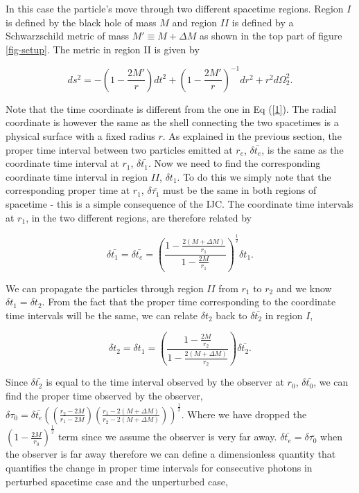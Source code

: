 \documentclass[aps,showpacs,onecolumn,floats,prd,superscriptaddress,nofootinbib]{revtex4-1}
\begin{document}
In this case the particle's move through two different spacetime regions. Region $I$ is defined by the black hole of mass $M$ and region $II$ is defined by a Schwarzschild metric of mass $M' \equiv M+\Delta M$ as shown in the top part of figure \ref{fig-setup}. The metric in region II is given by 

\begin{equation}
	ds^2 = - \left( 1 - \frac{2M'}{r} \right) d t^2 + \left( 1 - \frac{2M'}{r} \right)^{-1} dr^2 + r^2 d \Omega_2^2	\label{2}.
\end{equation}

Note that the time coordinate is different from the one in Eq (\ref{1}). The radial coordinate is however the same as the shell connecting the two spacetimes is a physical surface with a fixed radius $r$. As explained in the previous section, the proper time interval between two particles emitted at $r_e$, $\delta \bar{t_e}$, is the same as the coordinate time interval at $r_1$, $\delta \bar{t_1}$. Now we need to find the corresponding coordinate time interval in region $II$, $\delta t_1$. To do this we simply note that the corresponding proper time at $r_1$, $\delta \bar{\tau_1}$ must be the same in both regions of spacetime - this is a simple consequence of the IJC. The coordinate time intervals at $r_1$, in the two different regions, are therefore related by

\begin{equation}
	\delta \bar{t_1} = \delta \bar{t_e} = \left( \frac{1 - \frac{2(M + \Delta M)}{r_1}}{1 - \frac{2M}{r_1}} \right)^\frac{1}{2} \delta t_1.
\end{equation}

We can propagate the particles through region $II$ from $r_1$ to $r_2$ and we know $\delta t_1 = \delta t_2$. From the fact that the proper time corresponding to the coordinate time intervals will be the same, we can relate $\delta t_2$ back to $\delta \bar{t_2}$ in region $I$, 

\begin{equation}
	\delta t_2 = \delta t_1= \left( \frac{1 - \frac{2M}{r_2}}{1 - \frac{2(M + \Delta M)}{r_2}} \right) \delta \bar{t_2}.	\label{7}
\end{equation}

Since $\delta \bar{t_2}$ is equal to the time interval observed by the observer at $r_0$, $\delta \bar{t_0}$, we can find the proper time observed by the observer, $\delta {\tau_0}  = \delta {\bar{t_e}} \left( \left( \frac{r_2 - 2M}{r_1 - 2M} \right) \left( \frac{r_1 - 2(M+\Delta M)}{r_2 - 2(M + \Delta M)} \right) \right)^\frac{1}{2}$. Where we have dropped the $\left( 1 - \frac{2M}{r_0} \right)^\frac{1}{2}$ term since we assume the observer is very far away. $\delta {\bar{t_e}} = \delta {\bar{\tau_0}}$ when the observer is far away therefore we can define a dimensionless quantity that quantifies the change in proper time intervals for consecutive photons in perturbed spacetime case and the unperturbed case, 
\end{document}

